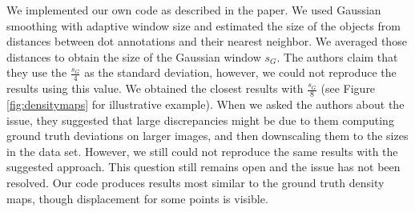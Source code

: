 We implemented our own code as described in the paper. We used Gaussian smoothing with adaptive window size and estimated the size of the objects from distances between dot annotations and their nearest neighbor. We averaged those distances to obtain the size of the Gaussian window $s_G$. The authors claim that they use the $\frac{s_G}{4}$ as the standard deviation, however, we could not reproduce the results using this value. We obtained the closest results with $\frac{s_G}{8}$ (see Figure \ref{fig:densitymaps} for illustrative example). When we asked the authors about the issue, they suggested that large discrepancies might be due to them computing ground truth deviations on larger images, and then downscaling them to the sizes in the data set. However, we still could not reproduce the same results with the suggested approach. This question still remains open and the issue has not been resolved. Our code produces results most similar to the ground truth density maps, though displacement for some points is visible.

